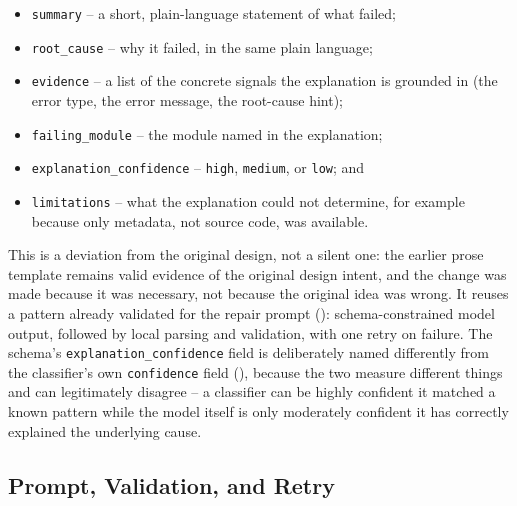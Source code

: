 \begin{itemize}
  \item \texttt{summary} -- a short, plain-language statement of what failed;
  \item \texttt{root\_cause} -- why it failed, in the same plain language;
  \item \texttt{evidence} -- a list of the concrete signals the explanation
        is grounded in (the error type, the error message, the root-cause
        hint);
  \item \texttt{failing\_module} -- the module named in the explanation;
  \item \texttt{explanation\_confidence} -- \texttt{high}, \texttt{medium},
        or \texttt{low}; and
  \item \texttt{limitations} -- what the explanation could not determine,
        for example because only metadata, not source code, was available.
\end{itemize}

This is a deviation from the original design, not a silent one: the earlier
prose template remains valid evidence of the original design intent, and the
change was made because it was necessary, not because the original idea was
wrong. It reuses a pattern already validated for the repair prompt
(): schema-constrained model output, followed by local
parsing and validation, with one retry on failure. The schema's
\texttt{explanation\_confidence} field is deliberately named differently
from the classifier's own \texttt{confidence} field
(), because the two measure different things and
can legitimately disagree -- a classifier can be highly confident it matched
a known pattern while the model itself is only moderately confident it has
correctly explained the underlying cause.

\subsection{Prompt, Validation, and Retry}

